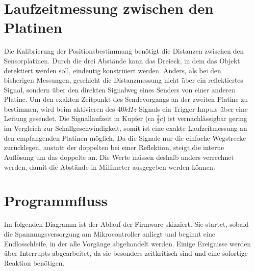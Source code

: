 \section{Laufzeitmessung zwischen den Platinen}
Die Kalibrierung der Positionsbestimmung benötigt die Distanzen zwischen den Sensorplatinen. Durch die drei Abstände kann das Dreieck, in dem das Objekt detektiert werden soll, eindeutig konstruiert werden. Anders, als bei den bisherigen Messungen, geschieht die Distanzmessung nicht über ein reflektiertes Signal, sondern über den direkten Signalweg eines Senders von einer anderen Platine. Um den exakten Zeitpunkt des Sendevorgangs an der zweiten Platine zu bestimmen, wird beim aktivieren des $40kHz$-Signals ein Trigger-Impuls über eine Leitung gesendet. Die Signallaufzeit in Kupfer (ca $\frac{2}{3}c$) ist vernachlässigbar gering im Vergleich zur Schallgeschwindigkeit, somit ist eine exakte Laufzeitmessung an den empfangenden Platinen möglich. Da die Signale nur die einfache Wegstrecke zurücklegen, anstatt der doppelten bei einer Reflektion, steigt die interne Auflösung um das doppelte an. Die Werte müssen deshalb anders verrechnet werden, damit die Abstände in Millimeter ausgegeben werden können.

\section{Programmfluss}
Im folgenden Diagramm ist der Ablauf der Firmware skizziert. Sie startet, sobald die Spannungsversorgung am Mikrocontroller anliegt und beginnt eine Endlosschleife, in der alle Vorgänge abgehandelt werden. Einige Ereignisse werden über Interrupts abgearbeitet, da sie besonders zeitkritisch sind und eine sofortige Reaktion benötigen.

